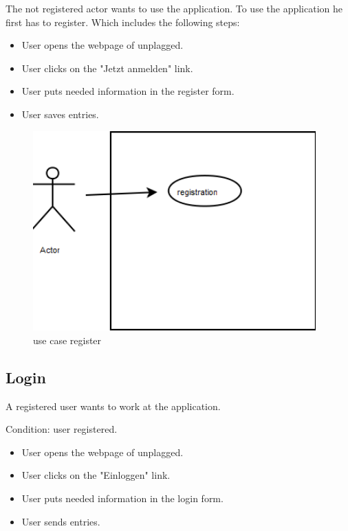 The not registered actor wants to use the application. To use the application he first has to register. Which includes 
the following steps:


\begin{itemize}
\item User opens the webpage of unplagged.
\item User clicks on the "Jetzt anmelden" link.
\item User puts needed information in the register form.
\item User saves entries.
\end{itemize}

\begin{figure}[!ht]
  \centering
    \includegraphics[width=0.97\textwidth]{images/use_cases/registration.png}
  \caption{use case register}
  \label{fig:use case register}
\end{figure}

\subsection{Login}

A registered user wants to work at the application.

Condition: user registered.

\begin{itemize}
\item User opens the webpage of unplagged.
\item User clicks on the "Einloggen" link.
\item User puts needed information in the login form.
\item User sends entries.
\end{itemize}

